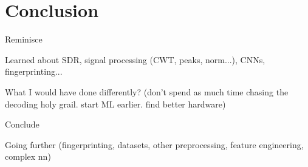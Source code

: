 \section{Conclusion}

Reminisce

  Learned about SDR, signal processing (CWT, peaks, norm...), CNNs, fingerprinting...

What I would have done differently? (don't spend as much time chasing the decoding holy grail. start ML earlier. find better hardware)

Conclude

Going further (fingerprinting, datasets, other preprocessing, feature engineering, complex nn)
